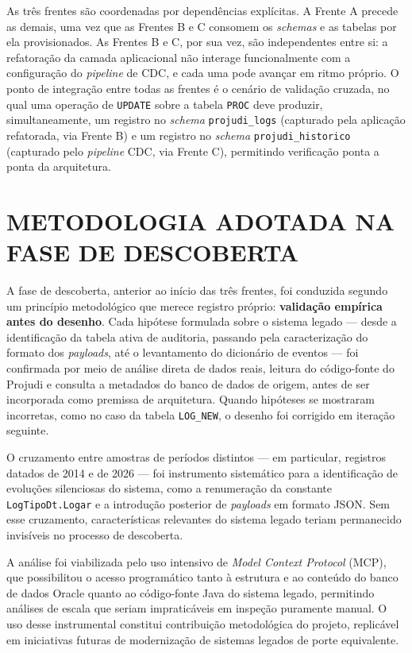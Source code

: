 \documentclass[12pt,letterpaper,oneside]{report}
\begin{document}
As três frentes são coordenadas por dependências explícitas. A Frente A precede as demais, uma vez que as Frentes B e C consomem os \textit{schemas} e as tabelas por ela provisionados. As Frentes B e C, por sua vez, são independentes entre si: a refatoração da camada aplicacional não interage funcionalmente com a configuração do \textit{pipeline} de CDC, e cada uma pode avançar em ritmo próprio. O ponto de integração entre todas as frentes é o cenário de validação cruzada, no qual uma operação de \texttt{UPDATE} sobre a tabela \texttt{PROC} deve produzir, simultaneamente, um registro no \textit{schema} \texttt{projudi\_logs} (capturado pela aplicação refatorada, via Frente B) e um registro no \textit{schema} \texttt{projudi\_historico} (capturado pelo \textit{pipeline} CDC, via Frente C), permitindo verificação ponta a ponta da arquitetura.

\section{METODOLOGIA ADOTADA NA FASE DE DESCOBERTA}

A fase de descoberta, anterior ao início das três frentes, foi conduzida segundo um princípio metodológico que merece registro próprio: \textbf{validação empírica antes do desenho}. Cada hipótese formulada sobre o sistema legado — desde a identificação da tabela ativa de auditoria, passando pela caracterização do formato dos \textit{payloads}, até o levantamento do dicionário de eventos — foi confirmada por meio de análise direta de dados reais, leitura do código-fonte do Projudi e consulta a metadados do banco de dados de origem, antes de ser incorporada como premissa de arquitetura. Quando hipóteses se mostraram incorretas, como no caso da tabela \texttt{LOG\_NEW}, o desenho foi corrigido em iteração seguinte.

O cruzamento entre amostras de períodos distintos — em particular, registros datados de 2014 e de 2026 — foi instrumento sistemático para a identificação de evoluções silenciosas do sistema, como a renumeração da constante \texttt{LogTipoDt.Logar} e a introdução posterior de \textit{payloads} em formato JSON. Sem esse cruzamento, características relevantes do sistema legado teriam permanecido invisíveis no processo de descoberta.

A análise foi viabilizada pelo uso intensivo de \textit{Model Context Protocol} (MCP), que possibilitou o acesso programático tanto à estrutura e ao conteúdo do banco de dados Oracle quanto ao código-fonte Java do sistema legado, permitindo análises de escala que seriam impraticáveis em inspeção puramente manual. O uso desse instrumental constitui contribuição metodológica do projeto, replicável em iniciativas futuras de modernização de sistemas legados de porte equivalente.
\end{document}
